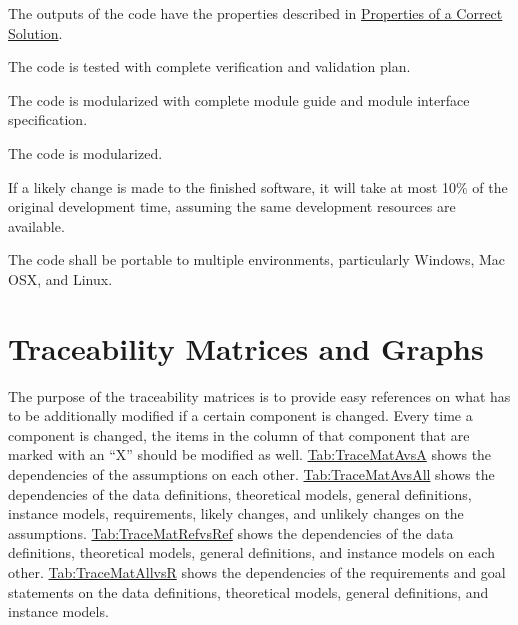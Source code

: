 \documentclass[12pt]{article}
\begin{document}
\begin{description}[font=\normalfont]
\item[Correctness:\phantomsection\label{correct}]{The outputs of the code have the properties described in \hyperref[Sec:CorSolProps]{Properties of a Correct Solution}.}
\item[Verifiability:\phantomsection\label{verifiable}]{The code is tested with complete verification and validation plan.}
\item[Understandability:\phantomsection\label{understandable}]{The code is modularized with complete module guide and module interface specification.}
\item[Reusability:\phantomsection\label{reusable}]{The code is modularized.}
\item[Maintainability:\phantomsection\label{maintainable}]{If a likely change is made to the finished software, it will take at most 10$\%$ of the original development time, assuming the same development resources are available.}
\item[Portability:\phantomsection\label{portable}]{The code shall be portable to multiple environments, particularly Windows, Mac OSX, and Linux.}
\end{description}
\section{Traceability Matrices and Graphs}
\label{Sec:TraceMatrices}
The purpose of the traceability matrices is to provide easy references on what has to be additionally modified if a certain component is changed. Every time a component is changed, the items in the column of that component that are marked with an ``X'' should be modified as well. \hyperref[Table:TraceMatAvsA]{Tab:TraceMatAvsA} shows the dependencies of the assumptions on each other. \hyperref[Table:TraceMatAvsAll]{Tab:TraceMatAvsAll} shows the dependencies of the data definitions, theoretical models, general definitions, instance models, requirements, likely changes, and unlikely changes on the assumptions. \hyperref[Table:TraceMatRefvsRef]{Tab:TraceMatRefvsRef} shows the dependencies of the data definitions, theoretical models, general definitions, and instance models on each other. \hyperref[Table:TraceMatAllvsR]{Tab:TraceMatAllvsR} shows the dependencies of the requirements and goal statements on the data definitions, theoretical models, general definitions, and instance models.
\end{document}
